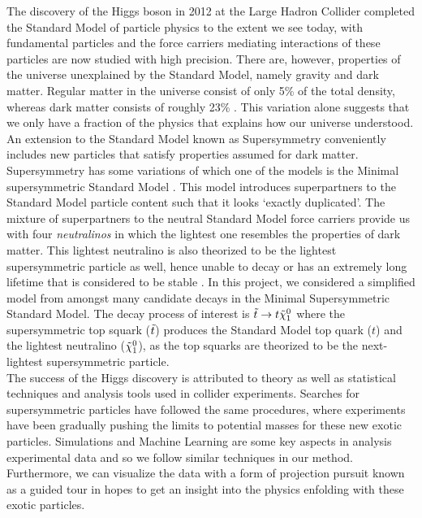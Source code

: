 The discovery of the Higgs boson in 2012 at the Large Hadron Collider completed the Standard Model of particle physics to the extent we see today, with fundamental particles and the force carriers mediating interactions of these particles are now studied with high precision. There are, however, properties of the universe unexplained by the Standard Model, namely gravity and dark matter. Regular matter in the universe consist of only 5\% of the total density, whereas dark matter consists of roughly 23\% \cite{thomson2013modern}. This variation alone suggests that we only have a fraction of the physics that explains how our universe understood.  \\

An extension to the Standard Model known as Supersymmetry conveniently includes new particles that satisfy properties assumed for dark matter. Supersymmetry has some variations of which one of the models is the Minimal supersymmetric Standard Model \cite{martin1997supersymmetry}. This model introduces superpartners to the Standard Model particle content such that it looks `exactly duplicated'. The mixture of superpartners to the neutral Standard Model force carriers provide us with four \textit{neutralinos} in which the lightest one resembles the properties of dark matter. This lightest neutralino is also theorized to be the lightest supersymmetric particle as well, hence unable to decay or has an extremely long lifetime that is considered to be stable \cite{martin1997supersymmetry}. In this project, we considered a simplified model from amongst many candidate decays in the Minimal Supersymmetric Standard Model. The decay process of interest is $\Tilde{t}\rightarrow t\Tilde{\chi}_1^0$ where the supersymmetric top squark ($\Tilde{t}$) produces the Standard Model top quark ($t$) and the lightest neutralino ($\Tilde{\chi}_1^0$), as the top squarks are theorized to be the next-lightest supersymmetric particle. \\

The success of the Higgs discovery is attributed to theory as well as statistical techniques and analysis tools used in collider experiments. Searches for supersymmetric particles have followed the same procedures, where experiments have been gradually pushing the limits to potential masses for these new exotic particles. Simulations and Machine Learning are some key aspects in analysis experimental data and so we follow similar techniques in our method. Furthermore, we can visualize the data with a form of projection pursuit known as a guided tour in hopes to get an insight into the physics enfolding with these exotic particles. \\

